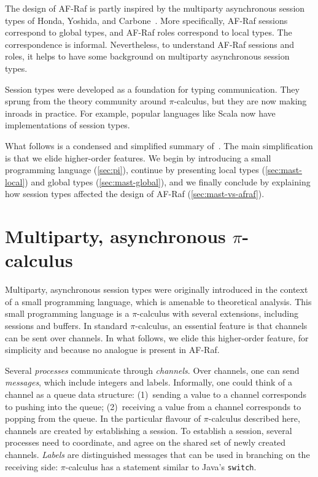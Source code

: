 \documentclass[a4paper,12pt,oneside,fleqn]{book} %
\begin{document}
The design of AF-Raf is partly inspired
  by the multiparty asynchronous session types
  of Honda, Yoshida, and Carbone~\cite{DBLP:journals/jacm/HondaYC16}.
More specifically,
  AF-Raf sessions correspond to global types,
  and AF-Raf roles correspond to local types.
The correspondence is informal.
Nevertheless,
  to understand AF-Raf sessions and roles,
  it helps to have some background on multiparty asynchronous session types.

Session types were developed as a foundation for typing communication.
They sprung from the theory community around $\pi$-calculus,
  but they are now making inroads in practice.
For example, popular languages like Scala
  now have implementations of session types.

What follows is a condensed and simplified summary
  of~\cite{DBLP:journals/jacm/HondaYC16}.
The main simplification is that we elide higher-order features.
We begin by introducing a small programming language (\autoref{sec:pi}),
  continue by presenting
    local types (\autoref{sec:mast-local})
    and global types (\autoref{sec:mast-global}),
  and we finally conclude by explaining how session types affected the
    design of AF-Raf (\autoref{sec:mast-vs-afraf}).


\section{Multiparty, asynchronous $\pi$-calculus}
\label{sec:pi}

Multiparty, asynchronous session types were originally introduced
  in the context of a small programming language,
    which is amenable to theoretical analysis.
This small programming language
  is a $\pi$-calculus with several extensions,
  including sessions and buffers.
In standard $\pi$-calculus,
  an essential feature is that channels can be sent over channels.
In what follows,
  we elide this higher-order feature,
  for simplicity and because no analogue is present in AF-Raf.

Several \emph{processes} communicate through \emph{channels}.
Over channels, one can send \emph{messages},
  which include integers and labels.
Informally, one could think of a channel as a queue data structure:
(1)~sending a value to a channel corresponds to pushing into the queue;
(2)~receiving a value from a channel corresponds to popping from the queue.
In the particular flavour of $\pi$-calculus described here,
  channels are created by establishing a session.
To establish a session,
  several processes need to coordinate,
  and agree on the shared set of newly created channels.
\emph{Labels} are distinguished messages
  that can be used in branching on the receiving side:
  $\pi$-calculus has a statement similar to Java's {\tt switch}.
\end{document}
